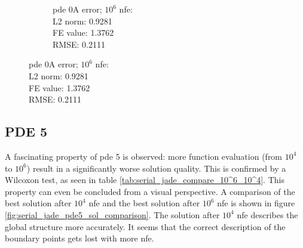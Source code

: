 \documentclass[./\jobname.tex]{subfiles}
\begin{document}
\begin{figure}[H]
\begin{subfigure}[b]{0.45\linewidth}
		\caption{\gls{pde} 0A error; $10^6$ \gls{nfe}: \\ L2 norm: 0.9281 \\ FE value: 1.3762 \\ RMSE: 0.2111}
		\label{fig:pde0a_sol_10_6}
	\end{subfigure}%
	\label{fig:serial_jade_pde0a_sol_comparison}
\end{figure}


\subsection{PDE 5}
\label{chap:ex0_pde5}
A fascinating property of \gls{pde} 5 is observed: more function evaluation (from $10^4$ to $10^6$) result in a significantly worse solution quality. This is confirmed by a Wilcoxon test, as seen in table \ref{tab:serial_jade_compare_10^6_10^4}. 
This property can even be concluded from a visual perspective. A comparison of the best solution after $10^4$ \gls{nfe} and the best solution after $10^6$ \gls{nfe} is shown in figure \ref{fig:serial_jade_pde5_sol_comparison}. The solution after $10^4$ \gls{nfe} describes the global structure more accurately. It seems that the correct description of the boundary points gets lost with more \gls{nfe}.
\end{document}
